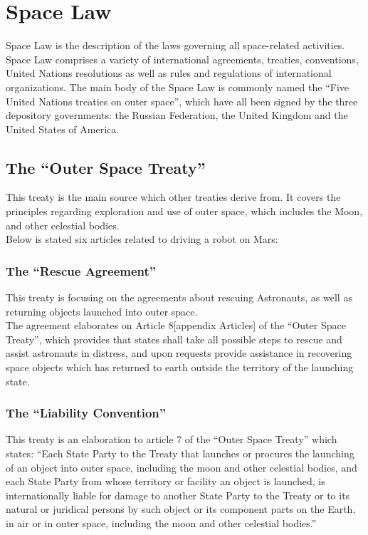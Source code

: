 \chapter{Space Law} \label{ch:Spacelaw}
Space Law is the description of the laws governing all space-related activities.
Space Law comprises a variety of international agreements, treaties, conventions, United Nations resolutions as well as rules and regulations of international organizations. The main body of the Space Law is commonly named the “Five United Nations treaties on outer space”, which have all been signed by the three depository governments: the Russian Federation, the United Kingdom and the United States of America.

\section{The “Outer Space Treaty”}
This treaty is the main source which other treaties derive from. It covers the principles regarding exploration and use of outer space, which includes the Moon, and other celestial bodies.\\
Below is stated six articles related to driving a robot on Mars:

\subsection{The “Rescue Agreement”}
This treaty is focusing on the agreements about rescuing Astronauts, as well as returning objects launched into outer space.\\
The agreement elaborates on Article 8[appendix Articles] of the “Outer Space Treaty”, which provides that states shall take all possible steps to rescue and assist astronauts in distress, and upon requests provide assistance in recovering space objects which has returned to earth outside the territory of the launching state\cite{Treaty2}.

\subsection{The “Liability Convention”}
This treaty is an elaboration to article 7 of the “Outer Space Treaty” which states:
“Each State Party to the Treaty that launches or procures the launching of an object into outer space, including the moon and other celestial bodies, and each State Party from whose territory or facility an object is launched, is internationally liable for damage to another State Party to the Treaty or to its natural or juridical persons by such object or its component parts on the Earth, in air or in outer space, including the moon and other celestial bodies\cite{Treaty3}.”

